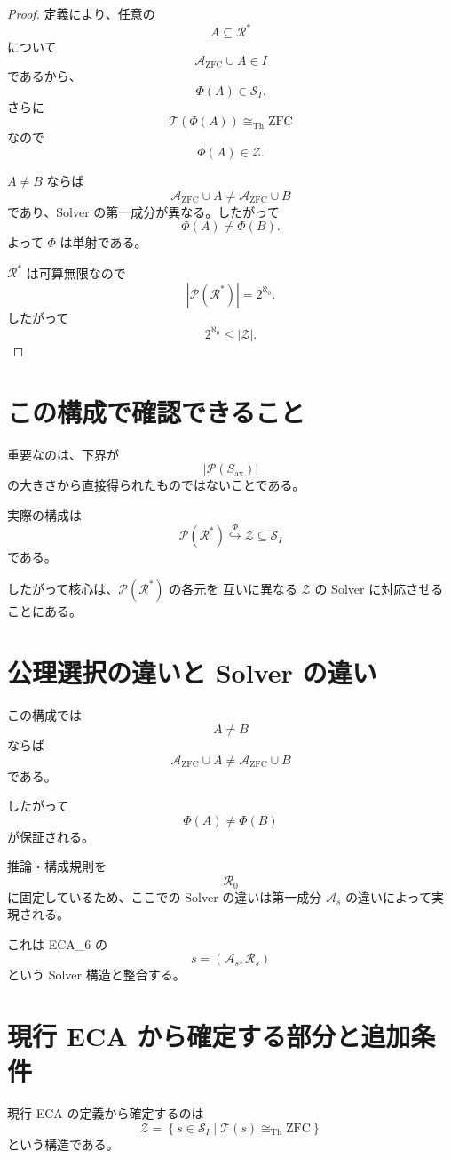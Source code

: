 \documentclass[a4paper,11pt]{jsarticle}
\newcommand{\Solver}{\mathcal{S}}
\newcommand{\Ax}{S_{\mathrm{ax}}}
\begin{document}
\begin{proof}
定義により、任意の
\[
A\subseteq\mathcal{R}^*
\]
について
\[
\mathcal{A}_{\mathrm{ZFC}}\cup A\in I
\]
であるから、
\[
\Phi(A)\in\Solver_I.
\]
さらに
\[
\mathcal{T}(\Phi(A))
\cong_{\mathrm{Th}}\mathrm{ZFC}
\]
なので
\[
\Phi(A)\in\mathcal{Z}.
\]

$A\neq B$ ならば
\[
\mathcal{A}_{\mathrm{ZFC}}\cup A
\neq
\mathcal{A}_{\mathrm{ZFC}}\cup B
\]
であり、Solver の第一成分が異なる。したがって
\[
\Phi(A)\neq\Phi(B).
\]
よって $\Phi$ は単射である。

$\mathcal{R}^*$ は可算無限なので
\[
|\mathcal{P}(\mathcal{R}^*)|=2^{\aleph_0}.
\]
したがって
\[
2^{\aleph_0}\leq|\mathcal{Z}|.
\]
\end{proof}

\section{この構成で確認できること}

重要なのは、下界が
\[
|\mathcal{P}(\Ax)|
\]
の大きさから直接得られたものではないことである。

実際の構成は
\[
\mathcal{P}(\mathcal{R}^*)
\overset{\Phi}{\hookrightarrow}
\mathcal{Z}
\subseteq\Solver_I
\]
である。

したがって核心は、$\mathcal{P}(\mathcal{R}^*)$ の各元を
互いに異なる $\mathcal{Z}$ の Solver に対応させることにある。

\section{公理選択の違いと Solver の違い}

この構成では
\[
A\neq B
\]
ならば
\[
\mathcal{A}_{\mathrm{ZFC}}\cup A
\neq
\mathcal{A}_{\mathrm{ZFC}}\cup B
\]
である。

したがって
\[
\Phi(A)\neq\Phi(B)
\]
が保証される。

推論・構成規則を
\[
\mathcal{R}_0
\]
に固定しているため、ここでの Solver の違いは第一成分
$\mathcal{A}_s$ の違いによって実現される。

これは ECA_6 の
\[
s=(\mathcal{A}_s,\mathcal{R}_s)
\]
という Solver 構造と整合する。

\section{現行 ECA から確定する部分と追加条件}

現行 ECA の定義から確定するのは
\[
\mathcal{Z}=
\left\{
s\in\Solver_I\mid
\mathcal{T}(s)\cong_{\mathrm{Th}}\mathrm{ZFC}
\right\}
\]
という構造である。
\end{document}
